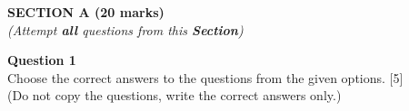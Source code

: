 \begin{center}
   \large
   \textbf{SECTION A (20 marks)}\\
   \vspace{5mm}
   \normalsize
   \textit{(Attempt \textbf{all} questions from this \textbf{Section})}
\end{center}
\par
\noindent
\textbf{Question 1}\\
Choose the correct answers to the questions from the given options. \hfill [5] \\
(Do not copy the questions, write the correct answers only.)
\par
\vspace{2mm}
